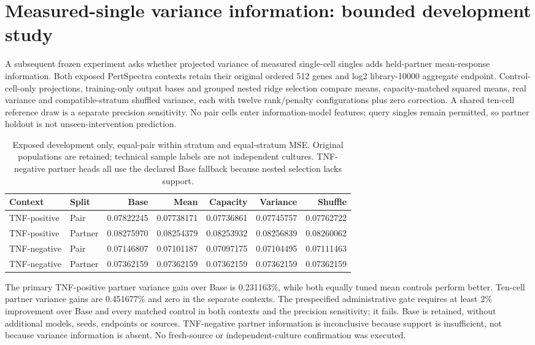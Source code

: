 \section{Measured-single variance information: bounded development study}

A subsequent frozen experiment asks whether projected variance of measured single-cell singles adds held-partner mean-response information. Both exposed PertSpectra contexts retain their original ordered 512 genes and log2 library-10000 aggregate endpoint. Control-cell-only projections, training-only output bases and grouped nested ridge selection compare means, capacity-matched squared means, real variance and compatible-stratum shuffled variance, each with twelve rank/penalty configurations plus zero correction. A shared ten-cell reference draw is a separate precision sensitivity. No pair cells enter information-model features; query singles remain permitted, so partner holdout is not unseen-intervention prediction.

\begin{table}[htbp]\centering\small

\begin{tabular}{llrrrrr}\toprule

Context & Split & Base & Mean & Capacity & Variance & Shuffle \\ \midrule

TNF-positive & Pair & 0.07822245 & 0.07738171 & 0.07736861 & 0.07745757 & 0.07762722 \\

TNF-positive & Partner & 0.08275970 & 0.08254379 & 0.08253932 & 0.08256839 & 0.08260062 \\

TNF-negative & Pair & 0.07146807 & 0.07101187 & 0.07097175 & 0.07104495 & 0.07111463 \\

TNF-negative & Partner & 0.07362159 & 0.07362159 & 0.07362159 & 0.07362159 & 0.07362159 \\

\bottomrule\end{tabular}

\caption{Exposed development only, equal-pair within stratum and equal-stratum MSE. Original populations are retained; technical sample labels are not independent cultures. TNF-negative partner heads all use the declared Base fallback because nested selection lacks support.}\end{table}

The primary TNF-positive partner variance gain over Base is 0.231163\%, while both equally tuned mean controls perform better. Ten-cell partner variance gains are 0.451677\% and zero in the separate contexts. The prespecified administrative gate requires at least 2\% improvement over Base and every matched control in both contexts and the precision sensitivity; it fails. Base is retained, without additional models, seeds, endpoints or sources. TNF-negative partner information is inconclusive because support is insufficient, not because variance information is absent. No fresh-source or independent-culture confirmation was executed.

